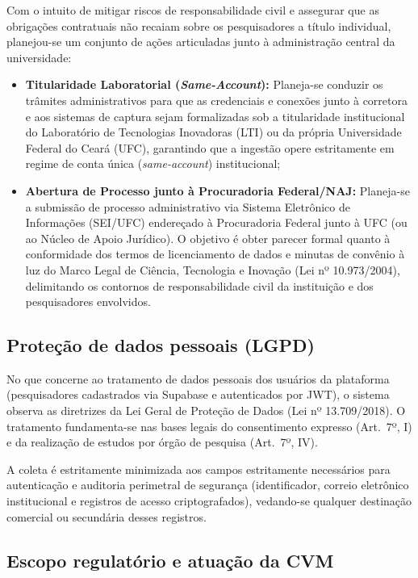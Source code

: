 Com o intuito de mitigar riscos de responsabilidade civil e assegurar que as obrigações contratuais não recaiam sobre os pesquisadores a título individual, planejou-se um conjunto de ações articuladas junto à administração central da universidade:
\begin{itemize}
    \item \textbf{Titularidade Laboratorial (\textit{Same-Account}):} Planeja-se conduzir os trâmites administrativos para que as credenciais e conexões junto à corretora e aos sistemas de captura sejam formalizadas sob a titularidade institucional do Laboratório de Tecnologias Inovadoras (LTI) ou da própria Universidade Federal do Ceará (UFC), garantindo que a ingestão opere estritamente em regime de conta única (\textit{same-account}) institucional;
    \item \textbf{Abertura de Processo junto à Procuradoria Federal/NAJ:} Planeja-se a submissão de processo administrativo via Sistema Eletrônico de Informações (SEI/UFC) endereçado à Procuradoria Federal junto à UFC (ou ao Núcleo de Apoio Jurídico). O objetivo é obter parecer formal quanto à conformidade dos termos de licenciamento de dados e minutas de convênio à luz do Marco Legal de Ciência, Tecnologia e Inovação (Lei nº 10.973/2004), delimitando os contornos de responsabilidade civil da instituição e dos pesquisadores envolvidos.
\end{itemize}

\subsection{Proteção de dados pessoais (LGPD)}

No que concerne ao tratamento de dados pessoais dos usuários da plataforma (pesquisadores cadastrados via Supabase e autenticados por JWT), o sistema observa as diretrizes da Lei Geral de Proteção de Dados (Lei nº 13.709/2018). O tratamento fundamenta-se nas bases legais do consentimento expresso (Art.~7º, I) e da realização de estudos por órgão de pesquisa (Art.~7º, IV). 

A coleta é estritamente minimizada aos campos estritamente necessários para autenticação e auditoria perimetral de segurança (identificador, correio eletrônico institucional e registros de acesso criptografados), vedando-se qualquer destinação comercial ou secundária desses registros.

\subsection{Escopo regulatório e atuação da CVM}

